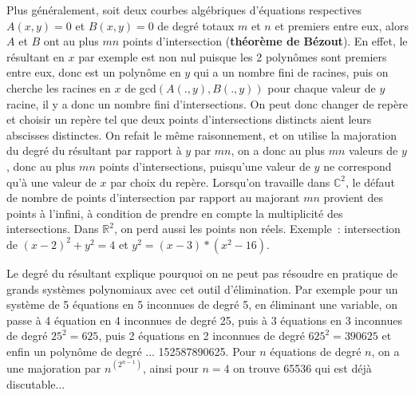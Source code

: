 \documentclass[a4paper,11pt]{article}
\newcommand{\R}{{\mathbb{R}}}
\newcommand{\C}{{\mathbb{C}}}
\begin{document}
Plus g\'en\'eralement, soit deux courbes alg\'ebriques d'\'equations respectives
$A(x,y)=0$ et $B(x,y)=0$ de degr\'e totaux $m$ et $n$ et premiers
entre eux, alors $A$ et
$B$ ont au plus $mn$ points d'intersection 
({\bf th\'eor\`eme de B\'ezout}). 
En effet, le r\'esultant
en $x$ par exemple est non nul puisque les 2 polyn\^omes sont premiers
entre eux, donc est un polyn\^ome en $y$ qui a un nombre fini de
racines, puis on cherche les racines en $x$ de gcd$(A(.,y),B(.,y))$
pour chaque valeur de $y$ racine, il y a donc un nombre fini
d'intersections. On peut donc changer de rep\`ere et choisir un
rep\`ere tel que deux points d'intersections distincts aient leurs
abscisses distinctes. On refait le m\^eme
raisonnement, et on utilise la majoration du degr\'e du r\'esultant
par rapport \`a $y$ par $mn$, on a donc au plus $mn$ valeurs
de $y$, donc au plus $mn$ points d'intersections, puisqu'une valeur
de $y$ ne correspond qu'\`a une valeur de $x$ par choix du rep\`ere.
Lorsqu'on travaille dans $\C^2$, le d\'efaut de nombre de points
d'intersection par rapport au majorant $mn$ provient des points \`a
l'infini, \`a condition de prendre en compte la multiplicit\'e des
intersections. Dans $\R^2$, on perd aussi les points non r\'eels.
Exemple~: intersection de $(x-2)^2+y^2=4$ et $y^2=(x-3)*(x^2-16)$.

Le degr\'e du r\'esultant explique pourquoi on ne peut pas r\'esoudre
en pratique de grands syst\`emes polynomiaux avec cet outil
d'\'elimination.
Par exemple pour un syst\`eme de 5 \'equations en 5 inconnues de
degr\'e 5, en \'eliminant une variable, on passe \`a 4 \'equation en
4 inconnues de degr\'e 25, puis \`a 3 \'equations en 3 inconnues
de degr\'e $25^2=625$, puis 2 \'equations en 2 inconnues de
degr\'e $625^2=390625$ et enfin un polyn\^ome de degr\'e ...
152587890625. Pour $n$ \'equations de degr\'e $n$, on a une majoration
par $n^{(2^{n-1})}$, ainsi pour $n=4$ on trouve 65536 qui est d\'ej\`a discutable...
\end{document}
